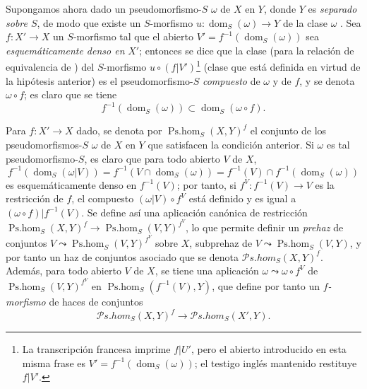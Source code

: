 \begin{env}[20.3.2]
\label{IV.20.3.2}
Supongamos ahora dado un pseudomorfismo-$S$ $\omega$ de $X$ en $Y$, donde $Y$ es \emph{separado sobre $S$}, de modo que existe un $S$-morfismo $u:\operatorname{dom}_S(\omega)\to Y$ de la clase $\omega$ .
Sea $f:X'\to X$ un $S$-morfismo tal que el abierto $V'=f^{-1}(\operatorname{dom}_S(\omega))$ sea \emph{esquemáticamente denso en} $X'$; entonces se dice que la clase (para la relación de equivalencia de ) del $S$-morfismo $u\circ(f|V')$\footnote{La transcripción francesa imprime $f|U'$, pero el abierto introducido en esta misma frase es $V'=f^{-1}(\operatorname{dom}_S(\omega))$; el testigo inglés mantenido restituye $f|V'$.} (clase que está definida en virtud de la hipótesis anterior) es el pseudomorfismo-$S$ \emph{compuesto} de $\omega$ y de $f$, y se denota $\omega\circ f$; es claro que se tiene
\[
\label{IV.20.3.2.1}
  f^{-1}(\operatorname{dom}_S(\omega))\subset\operatorname{dom}_S(\omega\circ f).
  \tag{20.3.2.1}
\]

Para $f:X'\to X$ dado, se denota por $\operatorname{Ps.hom}_S(X,Y)^f$ el conjunto de los pseudomorfismos-$S$ $\omega$ de $X$ en $Y$ que satisfacen la condición anterior.
Si $\omega$ es tal pseudomorfismo-$S$, es claro que para todo abierto $V$ de $X$,
\[
  f^{-1}(\operatorname{dom}_S(\omega|V))=f^{-1}(V\cap\operatorname{dom}_S(\omega))=f^{-1}(V)\cap f^{-1}(\operatorname{dom}_S(\omega))
\]
es esquemáticamente denso en $f^{-1}(V)$; por tanto, si $f^V:f^{-1}(V)\to V$ es la restricción de $f$, el compuesto $(\omega|V)\circ f^V$ está definido y es igual a $(\omega\circ f)|f^{-1}(V)$.
Se define así una
aplicación canónica de restricción $\operatorname{Ps.hom}_S(X,Y)^f\to\operatorname{Ps.hom}_S(V,Y)^{f^V}$, lo que permite definir un \emph{prehaz} de conjuntos $V\leadsto\operatorname{Ps.hom}_S(V,Y)^{f^V}$ sobre $X$, subprehaz de $V\leadsto\operatorname{Ps.hom}_S(V,Y)$, y por tanto un haz de conjuntos asociado que se denota $\mathscr{P}\!s.\mathit{hom}_S(X,Y)^f$.
Además, para todo abierto $V$ de $X$, se tiene una aplicación $\omega\leadsto\omega\circ f^V$ de $\operatorname{Ps.hom}_S(V,Y)^{f^V}$ en $\operatorname{Ps.hom}_S(f^{-1}(V),Y)$, que define por tanto un \emph{$f$-morfismo} de haces de conjuntos
\[
  \mathscr{P}\!s.\mathit{hom}_S(X,Y)^f\to\mathscr{P}\!s.\mathit{hom}_S(X',Y).
\]
\end{env}

